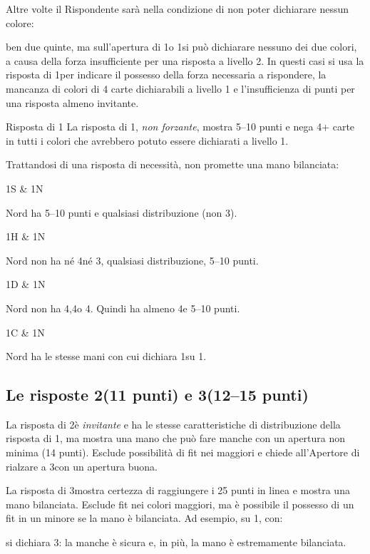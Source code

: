 \documentclass[../corsofiori.tex]{subfiles}
\begin{document}
Altre volte il Rispondente sarà nella condizione di non poter dichiarare nessun colore:


\noindent
ben due quinte, ma sull'apertura di 1\He o 1\Sp si può dichiarare nessuno dei due colori, a causa della forza
insufficiente per una risposta a livello 2. In questi casi si usa la risposta di 1\SA per indicare il possesso della
forza necessaria a rispondere, la mancanza di colori di 4 carte dichiarabili a livello 1 e l'insufficienza di punti per
una risposta almeno invitante.

\begin{regola}{Risposta di 1\SA}
    La risposta di 1\SA, \emph{non forzante}, mostra 5--10 punti e nega 4+ carte in tutti i colori che avrebbero
    potuto essere dichiarati a livello 1.
\end{regola}

Trattandosi di una risposta di necessità, non promette una mano bilanciata:

\smallskip
{}
\begin{biddingpair}
    1S & 1N\\
\end{biddingpair} \quad Nord ha 5--10 punti e qualsiasi distribuzione (non 3\Sp).

\smallskip
\begin{biddingpair}
    1H & 1N\\
\end{biddingpair} \quad Nord non ha né 4\Sp né 3\He, qualsiasi distribuzione, 5--10 punti.\\

\smallskip
\begin{biddingpair}
    1D & 1N\\
\end{biddingpair} \quad Nord non ha 4\Sp,4\He o 4\Di. Quindi ha almeno 4\Cl e 5--10 punti.\\


\smallskip
\begin{biddingpair}
    1C & 1N\\
\end{biddingpair} \quad Nord ha le stesse mani con cui dichiara 1\SA su 1\Di.

\subsection{Le risposte 2\SA (11 punti) e 3\SA (12--15 punti)}

La risposta di 2\SA è \emph{invitante} e ha le stesse caratteristiche di distribuzione della risposta di 1\SA, ma
mostra una mano che può fare manche con un apertura non minima (14 punti). Esclude possibilità di fit nei maggiori
e chiede all'Apertore di rialzare a 3\SA con un apertura buona.

La risposta di 3\SA mostra certezza di raggiungere i 25 punti in linea e mostra una mano bilanciata. Esclude fit nei
colori maggiori, ma è possibile il possesso di un fit in un minore se la mano è bilanciata. Ad esempio, su 1\Di, con:

\smallskip
{}

\noindent si dichiara 3\SA: la manche è sicura e, in più, la mano è estremamente bilanciata.
\end{document}

